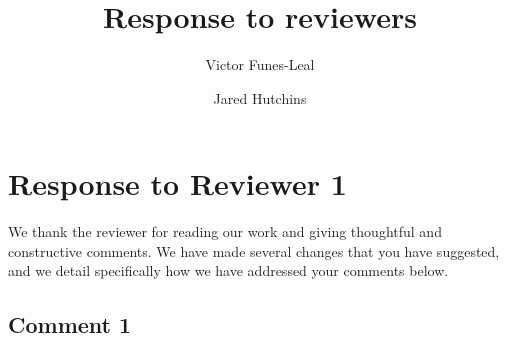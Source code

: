 \documentclass[12pt,letterpaper]{article}
\title{Response to reviewers}
\author{Victor Funes-Leal \and Jared Hutchins}
\date{}
\begin{document}

\noindent \section*{Response to Reviewer 1} 
\noindent We thank the reviewer for reading our work and giving thoughtful and constructive comments. We have made several changes that you have suggested, and we detail specifically how we have addressed your comments below.

\subsection*{Comment 1}
\end{document}
